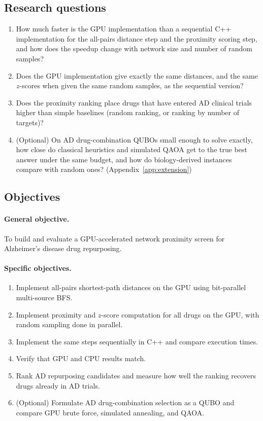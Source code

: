 \subsection{Research questions}

\begin{enumerate}[label=\textbf{RQ\arabic*.},leftmargin=*]
  \item How much faster is the GPU implementation than a sequential C++ implementation for the all-pairs distance step and the proximity scoring step, and how does the speedup change with network size and number of random samples?
  \item Does the GPU implementation give exactly the same distances, and the same $z$-scores when given the same random samples, as the sequential version?
  \item Does the proximity ranking place drugs that have entered AD clinical trials higher than simple baselines (random ranking, or ranking by number of targets)?
  \item (Optional) On AD drug-combination QUBOs small enough to solve exactly, how close do classical heuristics and simulated QAOA get to the true best answer under the same budget, and how do biology-derived instances compare with random ones? (Appendix~\ref{app:extension})
\end{enumerate}

\subsection{Objectives}

\paragraph{General objective.} To build and evaluate a GPU-accelerated
network proximity screen for Alzheimer's disease drug repurposing.

\paragraph{Specific objectives.}
\begin{enumerate}[nosep]
  \item Implement all-pairs shortest-path distances on the GPU using bit-parallel multi-source BFS.
  \item Implement proximity and $z$-score computation for all drugs on the GPU, with random sampling done in parallel.
  \item Implement the same steps sequentially in C++ and compare execution times.
  \item Verify that GPU and CPU results match.
  \item Rank AD repurposing candidates and measure how well the ranking recovers drugs already in AD trials.
  \item (Optional) Formulate AD drug-combination selection as a QUBO and compare GPU brute force, simulated annealing, and QAOA.
\end{enumerate}

